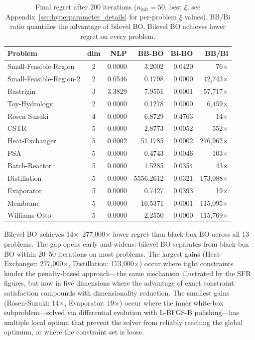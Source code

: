 \documentclass[12pt,a4paper]{article}%
\theoremstyle{plain}%
\theoremstyle{remark}%
\theoremstyle{definition}%
\begin{document}
\begin{table}[htbp]
\centering
\caption{Final regret after 200 iterations ($n_\text{init}=50$, best $\xi$; see Appendix~\ref{sec:hyperparameter_details} for per-problem $\xi$ values). BB/Bi ratio quantifies the advantage of bilevel BO. Bilevel BO achieves lower regret on every problem.}
\label{tab:final_regret}
\begin{tabular}{@{}lcrrrr@{}}
\toprule
\textbf{Problem} & \textbf{dim} & \textbf{NLP} & \textbf{BB-BO} & \textbf{Bi-BO} & \textbf{BB/Bi} \\
\midrule
Small-Feasible-Region   & 2 & 0.0000 & 3.2002    & 0.0420   & 76$\times$          \\
Small-Feasible-Region-2 & 2 & 0.0546 & 0.1798    & 0.0000   & 42{,}743$\times$    \\
Rastrigin               & 3 & 3.3829 & 7.9551    & 0.0001   & 57{,}717$\times$    \\
Toy-Hydrology           & 2 & 0.0000 & 0.1278    & 0.0000   & 6{,}459$\times$     \\
Rosen-Suzuki            & 4 & 0.0000 & 6.8729    & 0.4763   & 14$\times$          \\
\midrule
CSTR                    & 5 & 0.0000 & 2.8773    & 0.0052   & 552$\times$         \\
Heat-Exchanger          & 5 & 0.0002 & 51.1785   & 0.0002   & 276{,}962$\times$   \\
PSA                     & 5 & 0.0000 & 0.4743    & 0.0046   & 103$\times$         \\
Batch-Reactor           & 5 & 0.0000 & 1.5285    & 0.0354   & 43$\times$          \\
Distillation            & 5 & 0.0000 & 5556.2612 & 0.0321   & 173{,}088$\times$   \\
Evaporator              & 5 & 0.0000 & 0.7427    & 0.0393   & 19$\times$          \\
Membrane                & 5 & 0.0000 & 16.5371   & 0.0001   & 115{,}095$\times$   \\
Williams-Otto           & 5 & 0.0000 & 2.2550    & 0.0000   & 115{,}769$\times$   \\
\bottomrule
\end{tabular}
\end{table}

Bilevel BO achieves 14$\times$--277{,}000$\times$ lower regret than black-box BO across all 13 problems. The gap opens early and widens: bilevel BO separates from black-box BO within 20--50 iterations on most problems. The largest gains (Heat-Exchanger: 277{,}000$\times$, Distillation: 173{,}000$\times$) occur where tight constraints hinder the penalty-based approach---the same mechanism illustrated by the SFR figures, but now in five dimensions where the advantage of exact constraint satisfaction compounds with dimensionality reduction. The smallest gains (Rosen-Suzuki: 14$\times$, Evaporator: 19$\times$) occur where the inner white-box subproblem---solved via differential evolution with L-BFGS-B polishing---has multiple local optima that prevent the solver from reliably reaching the global optimum, or where the constraint set is loose.
\end{document}
